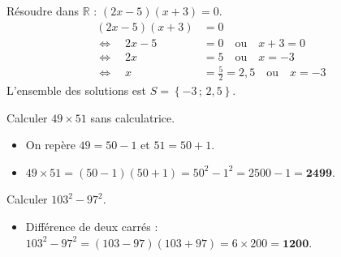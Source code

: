 \documentclass[11pt]{article}
\begin{document}
\begin{exemplebox}
Résoudre dans $\mathbb{R}$ : $(2x - 5)(x + 3) = 0$.
\begin{align*}
(2x - 5)(x + 3) &= 0 \\
\Leftrightarrow \quad 2x - 5 &= 0 \quad \text{ou} \quad x + 3 = 0 \\
\Leftrightarrow \quad 2x &= 5 \quad \text{ou} \quad x = -3 \\
\Leftrightarrow \quad x &= \frac{5}{2} = 2,5 \quad \text{ou} \quad x = -3
\end{align*}
L'ensemble des solutions est $\boxed{S = \left\{ -3 \,;\, 2,5 \right\}}$.
\end{exemplebox}

\begin{exemplebox}
Calculer $49 \times 51$ sans calculatrice.
\begin{itemize}
    \item On repère $49 = 50 - 1$ et $51 = 50 + 1$.
    \item $49 \times 51 = (50 - 1)(50 + 1) = 50^2 - 1^2 = 2500 - 1 = \mathbf{2499}$.
\end{itemize}
Calculer $103^2 - 97^2$.
\begin{itemize}
    \item Différence de deux carrés : $103^2 - 97^2 = (103 - 97)(103 + 97) = 6 \times 200 = \mathbf{1200}$.
\end{itemize}
\end{exemplebox}
\end{document}

